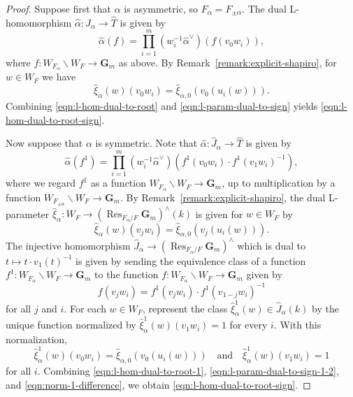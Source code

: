 \documentclass[reqno]{amsart}
\numberwithin{equation}{subsection}
\newcommand{\G}{\mathbf{G}}
\newcommand{\wh}[1]{\widehat{#1}}
\newcommand{\co}{\colon}
\DeclareMathOperator{\Res}{Res}
\theoremstyle{remark}
\numberwithin{equation}{subsection}
\numberwithin{figure}{subsection}
\begin{document}
\begin{proof}
Suppose first that $\alpha$ is asymmetric, so $F_\alpha = F_{\pm\alpha}$. The dual L-homomorphism $\wh\alpha\co \wh J_\alpha \to \wh T$ is given by
\begin{equation}\label{eqn:l-hom-dual-to-root}
\wh\alpha(f) = \prod_{i=1}^m (w_i^{-1}\wh\alpha^\vee)(f(v_0w_i)),
\end{equation}
where $f\co W_{F_\alpha}\backslash W_F \to \G_m$ as above. By Remark~\ref{remark:explicit-shapiro}, for $w\in W_F$ we have
\begin{equation}\label{eqn:l-param-dual-to-sign}
\wh \xi_\alpha(w)(v_0w_i) = \wh \xi_{\alpha,0}(v_0(u_i(w))).
\end{equation}
Combining \eqref{eqn:l-hom-dual-to-root} and \eqref{eqn:l-param-dual-to-sign} yields \eqref{eqn:l-hom-dual-to-root-sign}.

Now suppose that $\alpha$ is symmetric. Note that $\wh\alpha\co \wh J_\alpha \to \wh T$ is given by
\begin{equation}\label{eqn:l-hom-dual-to-root-1}
\wh\alpha(f^1) = \prod_{i=1}^m (w_i^{-1}\wh\alpha^\vee)(f^1(v_0w_i)\cdot f^1(v_1w_i)^{-1}),
\end{equation}
where we regard $f^1$ as a function $W_{F_\alpha}\backslash W_F \to \G_m$, up to multiplication by a function $W_{F_{\pm\alpha}}\backslash W_F \to \G_m$. By Remark~\ref{remark:explicit-shapiro}, the dual L-parameter $\wh \xi_\alpha\co W_F \to (\Res_{F_\alpha/F}\G_m)^\land(k)$ is given for $w \in W_F$ by
\begin{equation}\label{eqn:l-param-dual-to-sign-1-2}
\wh \xi_\alpha(w)(v_jw_i) = \wh \xi_{\alpha,0}(v_j(u_i(w))).
\end{equation}
The injective homomorphism $\wh J_\alpha \to (\Res_{F_\alpha/F}\G_m)^\land$ which is dual to $t \mapsto t \cdot v_1(t)^{-1}$ is given by sending the equivalence class of a function $f^1\co W_{F_\alpha}\backslash W_F \to \G_m$ to the function $f\co W_{F_\alpha}\backslash W_F \to \G_m$ given by
\[
f(v_jw_i) = f^1(v_jw_i) \cdot f^1(v_{1-j}w_i)^{-1}
\]
for all $j$ and $i$. For each $w\in W_F$, represent the class $\wh \xi_\alpha^1(w)\in\wh J_\alpha(k)$ by the unique function normalized by $\wh \xi_\alpha^1(w)(v_1w_i)=1$ for every $i$. With this normalization,
\begin{equation}\label{eqn:norm-1-difference}
\wh \xi_\alpha^1(w)(v_0w_i)=\wh \xi_{\alpha,0}(v_0(u_i(w)))
\quad\text{and}\quad
\wh \xi_\alpha^1(w)(v_1w_i)=1
\end{equation}
for all $i$. Combining \eqref{eqn:l-hom-dual-to-root-1}, \eqref{eqn:l-param-dual-to-sign-1-2}, and \eqref{eqn:norm-1-difference}, we obtain \eqref{eqn:l-hom-dual-to-root-sign}.
\end{proof}
\end{document}
